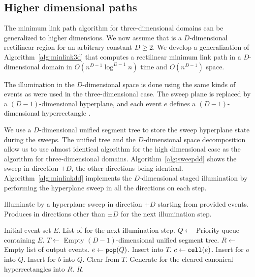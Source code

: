 \documentclass[english,gradu]{tktltiki2018}
\begin{document}
\subsection{Higher dimensional paths}

The minimum link path algorithm for three-dimensional domains can be generalized to higher dimensions.
We now assume that \fspace is a $D$-dimensional rectilinear region for an arbitrary constant $D\ge 2$.
We develop a generalization of Algorithm~\ref{alg:minlink3d} that computes a rectilinear minimum link path in a $D$-dimensional domain in $O(n^{D-1}\log^{D-1}n)$ time and $O(n^{D-1})$ space.

The illumination in the $D$-dimensional space is done using the same kinds of events as were used in the three-dimensional case.
The sweep plane is replaced by a $(D-1)$-dimensional hyperplane, and each event $e$ defines a $(D-1)$-dimensional hyperrectangle .

We use a $D$-dimensional unified segment tree to store the sweep hyperplane state during the sweeps.
The unified tree and the $D$-dimensional space decomposition allow us to use almost identical algorithm for the high dimensional case as the algorithm for three-dimensional domains.
Algorithm~\ref{alg:sweepdd} shows the sweep in direction $+D$, the other directions being identical.
Algorithm~\ref{alg:minlinkdd} implements the $D$-dimensional staged illumination by performing the hyperplane sweep in all the directions on each step.

\begin{algorithm}
\caption{Illuminate by a hyperplane sweep in direction $+D$ starting from provided events.
	Produces \addEs in directions other than $\pm D$ for the next illumination step.}
\label{alg:sweepdd}
\begin{algorithmic}
\Require Initial event set $E$.
\Output List of \addEs for the next illumination step.
\State $Q\gets$ Priority queue containing $E$.
\State $T\gets$ Empty $(D-1)$-dimensional unified segment tree.
\State $R\gets$ Empty list of output events.
	\State $e\gets\texttt{pop}(Q)$.
		\State Insert  into $T$.
			\State $c\gets\mathtt{cell}(e)$.
				\State Insert \obsE for $o$ into $Q$.
			\EndFor
				\State Insert \cellE for $b$ into $Q$.
			\EndFor
		\EndIf
		\State Clear  from $T$.
		\State Generate \addEs for the cleared canonical hyperrectangles into $R$.
	\EndIf
\EndWhile
\State \Return $R$.
\end{algorithmic}
\end{algorithm}
\end{document}
